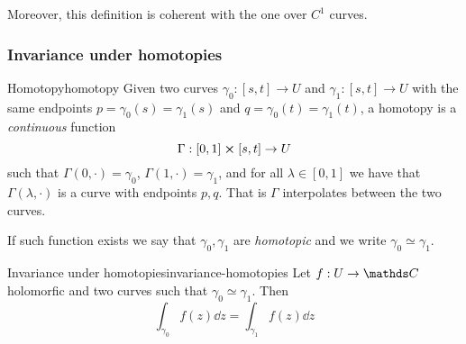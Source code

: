 \documentclass[12pt]{extarticle}
\begin{document}
Moreover, this definition is coherent with the one over $C^1$ curves.

\subsubsection{Invariance under homotopies}

\begin{definition}{Homotopy}{homotopy}
	Given two curves $\gamma_0: [s, t] \to U$ and $\gamma_1: [s, t] \to U$ with the same endpoints
	$p = \gamma_0(s) = \gamma_1(s)$ and $q = \gamma_0(t) = \gamma_1(t)$, a homotopy is a
	\emph{continuous} function
	\begin{equation}
		\Gamma: [0,1]\cross[s, t] \to U
	\end{equation}
	such that $\Gamma(0, \cdot) = \gamma_0$, $\Gamma(1, \cdot) = \gamma_1$, and
	for all $\lambda \in [0,1]$ we have that $\Gamma(\lambda, \cdot)$
	is a curve with endpoints $p, q$.
	That is $\Gamma$	interpolates between the two curves.

	If such function exists we say that $\gamma_0, \gamma_1$ are \emph{homotopic}
	and we write $\gamma_0 \simeq \gamma_1$.
\end{definition}

\begin{theorem}{Invariance under homotopies}{invariance-homotopies}
	Let $f: U \to \C$ holomorfic and two curves such that $\gamma_0 \simeq \gamma_1$.
	Then
	\begin{equation}
		\int_{\gamma_0} f(z) \dd z = \int_{\gamma_1} f(z) \dd z
	\end{equation}
\end{theorem}
\end{document}
